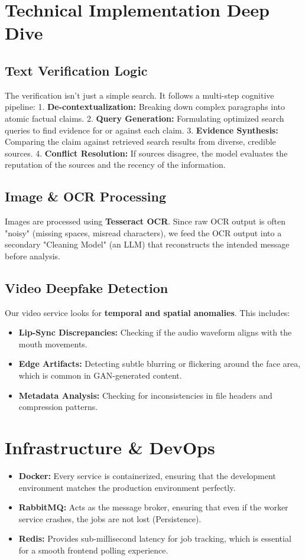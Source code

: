 \documentclass[12pt]{article}
\begin{document}
\section{Technical Implementation Deep Dive}

\subsection{Text Verification Logic}
The verification isn't just a simple search. It follows a multi-step cognitive pipeline:
1. \textbf{De-contextualization:} Breaking down complex paragraphs into atomic factual claims.
2. \textbf{Query Generation:} Formulating optimized search queries to find evidence for or against each claim.
3. \textbf{Evidence Synthesis:} Comparing the claim against retrieved search results from diverse, credible sources.
4. \textbf{Conflict Resolution:} If sources disagree, the model evaluates the reputation of the sources and the recency of the information.

\subsection{Image \& OCR Processing}
Images are processed using \textbf{Tesseract OCR}. Since raw OCR output is often "noisy" (missing spaces, misread characters), we feed the OCR output into a secondary "Cleaning Model" (an LLM) that reconstructs the intended message before analysis.

\subsection{Video Deepfake Detection}
Our video service looks for \textbf{temporal and spatial anomalies}. This includes:
\begin{itemize}
    \item \textbf{Lip-Sync Discrepancies:} Checking if the audio waveform aligns with the mouth movements.
    \item \textbf{Edge Artifacts:} Detecting subtle blurring or flickering around the face area, which is common in GAN-generated content.
    \item \textbf{Metadata Analysis:} Checking for inconsistencies in file headers and compression patterns.
\end{itemize}

\section{Infrastructure \& DevOps}
\begin{itemize}
    \item \textbf{Docker:} Every service is containerized, ensuring that the development environment matches the production environment perfectly.
    \item \textbf{RabbitMQ:} Acts as the message broker, ensuring that even if the worker service crashes, the jobs are not lost (Persistence).
    \item \textbf{Redis:} Provides sub-millisecond latency for job tracking, which is essential for a smooth frontend polling experience.
\end{itemize}
\end{document}
